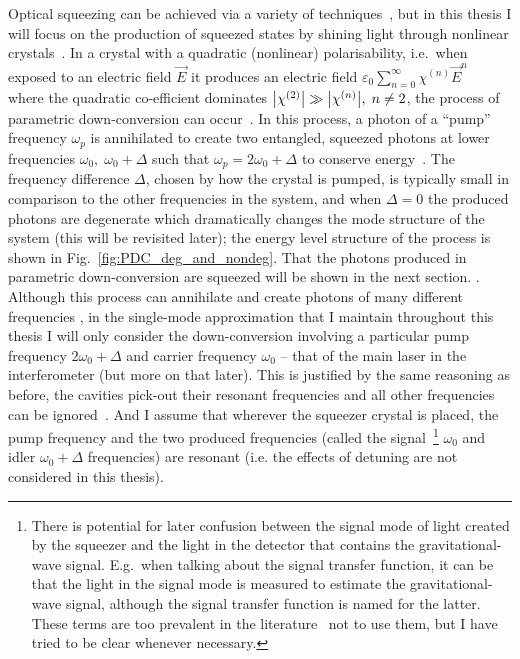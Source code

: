 Optical squeezing can be achieved via a variety of techniques~\cite{}, but in this thesis I will focus on the production of squeezed states by shining light through nonlinear crystals~\cite{}. In a crystal with a quadratic (nonlinear) polarisability, i.e.\ when exposed to an electric field $\vec E$ it produces an electric field $\varepsilon_0 \sum_{n=0}^\infty \chi^{(n)} {\vec E}^n$~\cite{ ref in Kirk thesis?}  where the quadratic co-efficient dominates $\abs{\chi^{(2)}}\gg\abs{\chi^{(n)}},\; n\neq2$, the process of parametric down-conversion can occur~\cite{}. In this process, a photon of a  ``pump'' frequency $\omega_p$ is annihilated to create two entangled, squeezed photons at lower frequencies $\omega_0,\; \omega_0+\Delta$ such that $\omega_p=2\omega_0+\Delta$ to conserve energy~\cite{}. The frequency difference $\Delta$, chosen by how the crystal is pumped, is typically small in comparison to the other frequencies in the system, and when $\Delta=0$ the produced photons are degenerate which dramatically changes the mode structure of the system (this will be revisited later); the energy level structure of the process is shown in Fig.~\ref{fig:PDC_deg_and_nondeg}. That the photons produced in parametric down-conversion are squeezed will be shown in the next section. %
. Although this process can annihilate and create photons of many different frequencies , in the single-mode approximation that I maintain throughout this thesis I will only consider the down-conversion involving a particular pump frequency $2\omega_0+\Delta$ and carrier frequency $\omega_0$ -- that of the main laser in the interferometer (but more on that later). This is justified by the same reasoning as before, the cavities pick-out their resonant frequencies and all other frequencies can be ignored~\cite{}. And I assume that wherever the squeezer crystal is placed, the pump frequency and the two produced frequencies (called the signal~\footnote{There is potential for later confusion between the signal mode of light created by the squeezer and the light in the detector that contains the gravitational-wave signal. E.g.\ when talking about the signal transfer function, it can be that the light in the signal mode is measured to estimate the gravitational-wave signal, although the signal transfer function is named for the latter. These terms are too prevalent in the literature~\cite{} not to use them, but I have tried to be clear whenever necessary.} $\omega_0$ and idler $\omega_0+\Delta$ frequencies) are resonant (i.e. the effects of detuning are not considered in this thesis).

